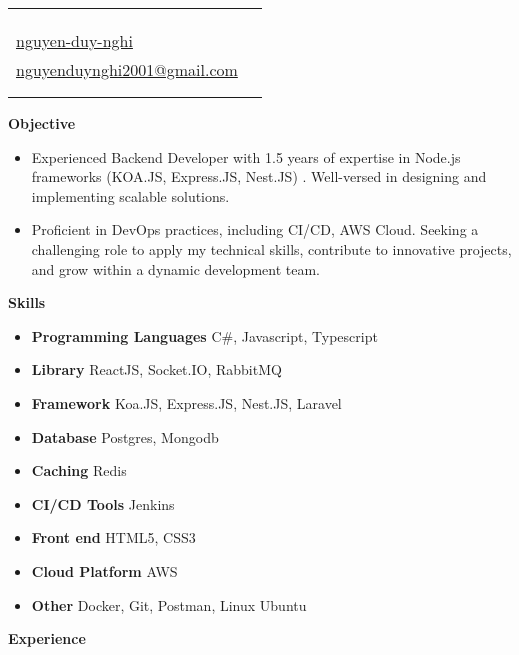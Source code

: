 \documentclass[letterpaper,12pt]{article}[leftmargin=*]
\makeatletter
\def \fullname {Nguyen Duy Nghi}
\def \subtitle {}
\def \phoneicon {\faPhone}
\def \phonetext {0799232407}
\def \emailicon {\faEnvelope}
\def \emaillink {mailto:nguyenduynghi2001@gmail.com}
\def \emailtext {nguyenduynghi2001@gmail.com}
\def \githubicon {\faLinkedin}
\def \githublink {https://www.linkedin.com/in/nguyen-duy-nghi/}
\def \githubtext {nguyen-duy-nghi}
\def \websiteicon {\faMapMarker}
\def \websitetext {Ho Chi Minh, Viet Nam}
\def \headertype {\singlecol} %
\def \entryspacing {-0pt}
\def \linkedin {\linkedinicon \hspace{3pt}\href{\linkedinlink}{\linkedintext}}
\def \phone {\phoneicon \hspace{3pt}{ \phonetext}}
\def \email {\emailicon \hspace{3pt}\href{\emaillink}{\emailtext}}
\def \github {\githubicon \hspace{3pt}\href{\githublink}{\githubtext}}
\def \website {\websiteicon \hspace{3pt}\href{\websitelink}{\websitetext}}
\renewcommand{\section}[2]{\vspace{5pt}
  \colorbox{secondary}{\color{white}\raggedbottom\normalsize\textbf{{#1}{\hspace{7pt}#2}}}
}
\newcommand{\resumeEntryStart}{\begin{itemize}[leftmargin=2.5mm]}
\newcommand{\resumeEntryEnd}{\end{itemize}\vspace{\entryspacing}}
\newcommand{\resumeItemListStart}{\begin{itemize}[leftmargin=4.5mm]}
\newcommand{\resumeItem}[1]{
  \item\small{
    {#1 \vspace{-2pt}}
  }
}
\newcommand{\resumeEntryS}[2]{
  \item[]\small{
    \textbf{\color{primary}#1 }{ #2 \vspace{-6pt}}
  }
}
\newcommand{\doublecol}[6]{
  \begin{tabularx}{\textwidth}{Xr}
    {
      \begin{tabular}[c]{l}
        \fontsize{35}{45}\selectfont{\color{primary}{{\textbf{\fullname}}}} \\
        {\textit{\subtitle}} %
      \end{tabular}
    } & {
      \begin{tabular}[c]{l@{\hspace{1.5em}}l}
        {\small#4} & {\small#1} \\
        {\small#5} & {\small#2} \\
        {\small#6} & {\small#3}
      \end{tabular}
    }
  \end{tabularx}
}
\newcommand{\singlecol}[6]{
  \begin{tabularx}{\textwidth}{Xr}
    {
      \begin{tabular}[b]{l}
        \fontsize{35}{45}\selectfont{\color{primary}{{\textbf{\fullname}}}} \\
        {\textit{\subtitle}} %
      \end{tabular}
    } & {
      \begin{tabular}[c]{l}
        {\small#1} \\
        {\small#2} \\
        {\small#3} \\
        {\small#4} \\
        {\small#5} \\
        {\small#6}
      \end{tabular}
    }
  \end{tabularx}
}
\makeatother
\begin{document}


\headertype{\website}{\phone}{\github}{\email}{\linkedin}{} %
\vspace{-10pt} %
\section{\faBars}{Objective}


\resumeEntryStart
    \resumeItemListStart
        \resumeItem{Experienced Backend Developer with 1.5 years of expertise in Node.js frameworks (KOA.JS, Express.JS, Nest.JS) . Well-versed in designing and implementing scalable solutions.}
        \resumeItem{Proficient in DevOps practices, including CI/CD, AWS Cloud. Seeking a challenging role to apply my technical skills, contribute to innovative projects, and grow within a dynamic development team.}
    \resumeEntryEnd


\resumeEntryEnd


\section{\faGears}{Skills}

 \resumeEntryStart
  \resumeEntryS{Programming Languages } {C\#, Javascript, Typescript}
  \resumeEntryS{Library } {ReactJS, Socket.IO, RabbitMQ}
  \resumeEntryS{Framework} {Koa.JS, Express.JS, Nest.JS, Laravel}
  \resumeEntryS{Database} {Postgres, Mongodb}
  \resumeEntryS{Caching} {Redis}
  \resumeEntryS{CI/CD Tools} {Jenkins}
  \resumeEntryS{Front end} {HTML5, CSS3}
  \resumeEntryS{Cloud Platform} {AWS}
  \resumeEntryS{Other} {Docker, Git, Postman, Linux Ubuntu}
 \resumeEntryEnd


\section{\faPieChart}{Experience}
\end{document}
